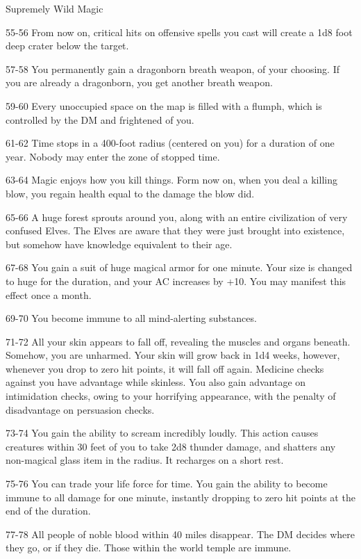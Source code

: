 \begin{rolltable}[0.9\textheight/0pt]{Supremely Wild Magic}
\item[55-56] From now on, critical hits on offensive spells you cast will create a 1d8 foot deep crater below the target.
\item[57-58] You permanently gain a dragonborn breath weapon, of your choosing. If you are already a dragonborn, you get another breath weapon.
\item[59-60] Every unoccupied space on the map is filled with a flumph, which is controlled by the DM and frightened of you.
\item[61-62] Time stops in a 400-foot radius (centered on you) for a duration of one year. Nobody may enter the zone of stopped time.
\item[63-64] Magic enjoys how you kill things.
Form now on, when you deal a killing blow, you regain health equal to the damage the blow did.
\item[65-66] A huge forest sprouts around you, along with an entire civilization of very confused Elves.
The Elves are aware that they were just brought into existence, but somehow have knowledge equivalent to their age.
\item[67-68] You gain a suit of huge magical armor for one minute. 
Your size is changed to huge for the duration, and your AC increases by +10.
You may manifest this effect once a month.
\item[69-70] You become immune to all mind-alerting substances.
\item[71-72] All your skin appears to fall off, revealing the muscles and organs beneath. 
Somehow, you are unharmed.
Your skin will grow back in 1d4 weeks, however, whenever you drop to zero hit points, it will fall off again.
Medicine checks against you have advantage while skinless.
You also gain advantage on intimidation checks, owing to your horrifying appearance, with the penalty of disadvantage on persuasion checks.
\item[73-74] You gain the ability to scream incredibly loudly.
This action causes creatures within 30 feet of you to take 2d8 thunder damage, and shatters any non-magical glass item in the radius.
It recharges on a short rest.
\item[75-76] You can trade your life force for time.
You gain the ability to become immune to all damage for one minute, instantly dropping to zero hit points at the end of the duration.
\item[77-78] All people of noble blood within 40 miles disappear.
The DM decides where they go, or if they die.
Those within the world temple are immune.

\end{rolltable}
